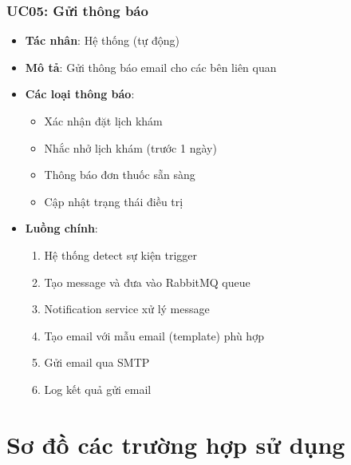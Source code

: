 \documentclass[12pt,a4paper]{report}
\begin{document}
    \subsubsection{UC05: Gửi thông báo}
    \begin{itemize}
        \item \textbf{Tác nhân}: Hệ thống (tự động)
        \item \textbf{Mô tả}: Gửi thông báo email cho các bên liên quan
        \item \textbf{Các loại thông báo}:
        \begin{itemize}
            \item Xác nhận đặt lịch khám
            \item Nhắc nhở lịch khám (trước 1 ngày)
            \item Thông báo đơn thuốc sẵn sàng
            \item Cập nhật trạng thái điều trị
        \end{itemize}
        \item \textbf{Luồng chính}:
        \begin{enumerate}
            \item Hệ thống detect sự kiện trigger
            \item Tạo message và đưa vào RabbitMQ queue
            \item Notification service xử lý message
            \item Tạo email với mẫu email (template) phù hợp
            \item Gửi email qua SMTP
            \item Log kết quả gửi email
        \end{enumerate}
    \end{itemize}

    \section{Sơ đồ các trường hợp sử dụng}
\end{document}
